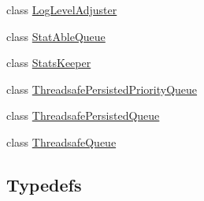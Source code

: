 \begin{DoxyCompactItemize}
class \hyperlink{classkisscpp_1_1_log_level_adjuster}{Log\-Level\-Adjuster}
\item 
class \hyperlink{classkisscpp_1_1_stat_able_queue}{Stat\-Able\-Queue}
\item 
class \hyperlink{classkisscpp_1_1_stats_keeper}{Stats\-Keeper}
\item 
class \hyperlink{classkisscpp_1_1_threadsafe_persisted_priority_queue}{Threadsafe\-Persisted\-Priority\-Queue}
\item 
class \hyperlink{classkisscpp_1_1_threadsafe_persisted_queue}{Threadsafe\-Persisted\-Queue}
\item 
class \hyperlink{classkisscpp_1_1_threadsafe_queue}{Threadsafe\-Queue}
\end{DoxyCompactItemize}
\subsection*{Typedefs}
